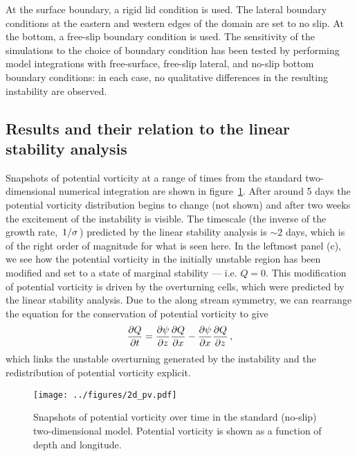 At the surface boundary, a rigid lid condition is used. The lateral boundary conditions at the eastern and western edges of the domain are set to no slip. At the bottom, a free-slip boundary condition is used. The sensitivity of the simulations to the choice of boundary condition has been tested by performing model integrations with free-surface, free-slip lateral, and no-slip bottom boundary conditions: in each case, no qualitative differences in the resulting instability are observed.

\subsection{Results and their relation to the linear stability analysis}
Snapshots of potential vorticity at a range of times from the standard two-dimensional numerical integration are shown in figure~\ref{fig:2DPVSnapshotsStandard}.
After around 5 days the potential vorticity distribution begins to change (not shown) and after two weeks the excitement of the instability is visible. The timescale (the inverse of the growth rate, $\flatfrac{1}{\sigma}$) predicted by the linear stability analysis is $\sim 2$ days, which is of the right order of magnitude for what is seen here. In the leftmost panel (c), we see how the potential vorticity in the initially unstable region has been modified and set to a state of marginal stability --- i.e. $Q = 0$. This modification of potential vorticity is driven by the overturning cells, which were predicted by the linear stability analysis. Due to the along stream symmetry, we can rearrange the equation for the conservation of potential vorticity to give
\begin{equation}
    \label{eq:PVEvolution}
    \pdv{Q}{t} = \pdv{\psi}{z}\pdv{Q}{x} - \pdv{\psi}{x}\pdv{Q}{z} \, ,%
\end{equation}
which links the unstable overturning generated by the instability and the redistribution of potential vorticity explicit\footnotemark.

\begin{figure}
    \centering
    \texttt{[image: ../figures/2d\_pv.pdf]}
    \caption{Snapshots of potential vorticity over time in the standard (no-slip) two-dimensional model. Potential vorticity is shown as a function of depth and longitude.}
    \label{fig:2DPVSnapshotsStandard}
\end{figure}



